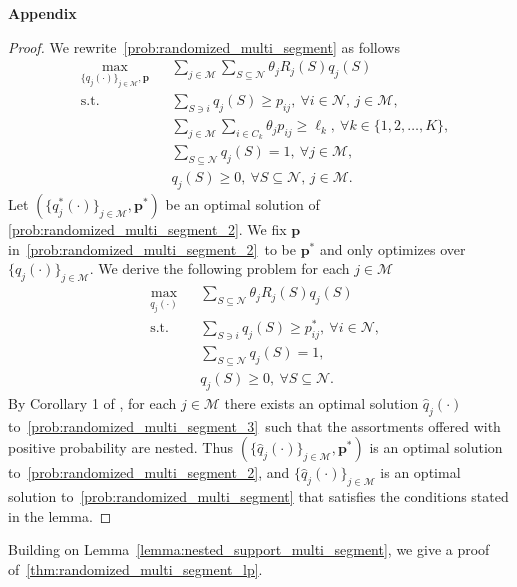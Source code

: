\documentclass[msom,non-blindrev]{informs3} %
\theoremstyle{definition}
\begin{document}
\begin{appendices}{\Large \noindent\textbf{Appendix}}
\begin{proof}
We rewrite~\eqref{prob:randomized_multi_segment} as follows
\begin{equation}\label{prob:randomized_multi_segment_2}
\begin{aligned}
&\max_{\{q_j(\cdot)\}_{j\in\mathcal{M}},\mathbf{p}}&&{\sum_{j\in\mathcal{M}}\sum_{S\subseteq\mathcal{N}}\theta_jR_j(S)q_j(S)}\\
&\text{s.t.}&&{\sum_{S\ni i}q_j(S)\geq p_{ij},\ \forall i\in\mathcal{N},\,j\in\mathcal{M},}\\
&&&{\sum_{j\in\mathcal{M}}\sum_{i\in C_k}\theta_jp_{ij}\geq \ell_k,\ \forall k\in\{1,2,\dots,K\},}\\
&&&{\sum_{S\subseteq\mathcal{N}}q_j(S)=1,\ \forall j\in\mathcal{M},}\\
&&&{q_j(S)\geq 0,\ \forall S\subseteq\mathcal{N},\,j\in\mathcal{M}.}
\end{aligned}
\end{equation}
Let $(\{q^*_j(\cdot)\}_{j\in\mathcal{M}},\mathbf{p}^*)$ be an optimal solution of \eqref{prob:randomized_multi_segment_2}. We fix $\mathbf{p}$ in~\eqref{prob:randomized_multi_segment_2}~to be $\mathbf{p}^*$ and only optimizes over $\{q_j(\cdot)\}_{j\in\mathcal{M}}$. We derive the following problem for each $j\in\mathcal{M}$
\begin{equation}\label{prob:randomized_multi_segment_3}
\begin{aligned}
&\max_{q_j(\cdot)}&&{\sum_{S\subseteq\mathcal{N}}\theta_jR_j(S)q_j(S)}\\
&\text{s.t.}&&{\sum_{S\ni i}q_j(S)\geq p^*_{ij},\ \forall i\in\mathcal{N},}\\
&&&{\sum_{S\subseteq\mathcal{N}}q_j(S)=1,}\\
&&&{q_j(S)\geq 0,\ \forall S\subseteq\mathcal{N}.}
\end{aligned}
\end{equation}
By Corollary 1 of \cite{lu2023simple}, for each $j\in\mathcal{M}$ there exists an optimal solution $\hat{q}_j(\cdot)$ to~\eqref{prob:randomized_multi_segment_3}~such that the assortments offered with positive probability are nested. Thus $(\{\hat{q}_j(\cdot)\}_{j\in\mathcal{M}},\mathbf{p}^*)$ is an optimal solution to~\eqref{prob:randomized_multi_segment_2}, and $\{\hat{q}_j(\cdot)\}_{j\in\mathcal{M}}$ is an optimal solution to~\eqref{prob:randomized_multi_segment} that satisfies the conditions stated in the lemma.
\end{proof}

Building on Lemma~\ref{lemma:nested_support_multi_segment}, we give a proof of~\cref{thm:randomized_multi_segment_lp}.


\end{appendices}
\end{document}
